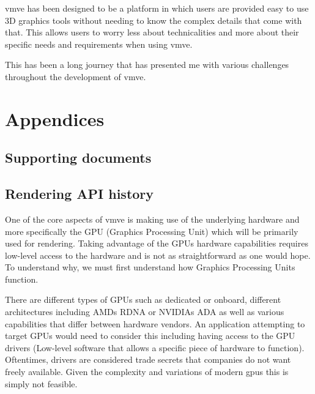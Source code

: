 \documentclass[11pt]{article}
\begin{document}
\gls*{vmve} has been designed to be a platform in which users are provided easy to use
3D graphics tools without needing to know the complex details that come with
that. This allows users to worry less about technicalities and more about their
specific needs and requirements when using \gls*{vmve}.

This has been a long journey that has presented me with various challenges
throughout the development of \gls*{vmve}.

\clearpage
\printnoidxglossary

\clearpage
\printnoidxglossary[type=\acronymtype]

\clearpage



\clearpage
\section{Appendices}

\subsection{Supporting documents} \label{supporting_documents}

\subsection{Rendering API history} \label{rendering_api_appendix}
One of the core aspects of \gls*{vmve} is making use of the underlying hardware and
more specifically the GPU (Graphics Processing Unit) which will be primarily
used for rendering. Taking advantage of the GPUs hardware capabilities requires
low-level access to the hardware and is not as straightforward as one would
hope. To understand why, we must first understand how Graphics Processing Units
function.

There are different types of GPUs such as dedicated or onboard, different
architectures including AMDs RDNA \cite{RDNA} or NVIDIAs ADA \cite{ADA} as well
as various capabilities that differ between hardware vendors. An application
attempting to target GPUs would need to consider this including having access to
the GPU drivers (Low-level software that allows a specific piece of hardware to
function). Oftentimes, drivers are considered trade secrets that companies do
not want freely available. Given the complexity and variations of modern
\glspl*{gpu} this is simply not feasible.
\end{document}
